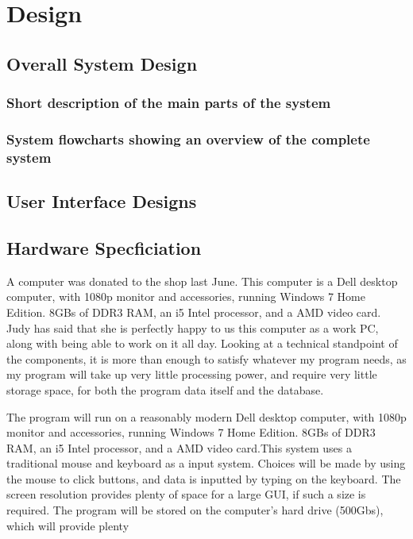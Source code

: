 \chapter{Design}

\section{Overall System Design}

\subsection{Short description of the main parts of the system}

\subsection{System flowcharts showing an overview of the complete system}

\section{User Interface Designs}

\section{Hardware Specficiation}
A computer was donated to the shop last June. This computer is a Dell desktop computer, with 1080p monitor and accessories, running Windows 7 Home Edition. 8GBs of DDR3 RAM, an i5 Intel processor, and a AMD video card. Judy has said that she is perfectly happy to us this computer as a work PC, along with being able to work on it all day. Looking at a technical standpoint of the components, it is more than enough to satisfy whatever my program needs, as my program will take up very little processing power, and require very little storage space, for both the program data itself and the database.

The program will run on a reasonably modern Dell desktop computer, with 1080p monitor and accessories, running Windows 7 Home Edition. 8GBs of DDR3 RAM, an i5 Intel processor, and a AMD video card.This system uses a traditional mouse and keyboard as a input system. Choices will be made by using the mouse to click buttons, and data is inputted by typing on the keyboard. The screen resolution provides plenty of space for a large GUI, if such a size is required. The program will be stored on the computer's hard drive (500Gbs), which will provide plenty

